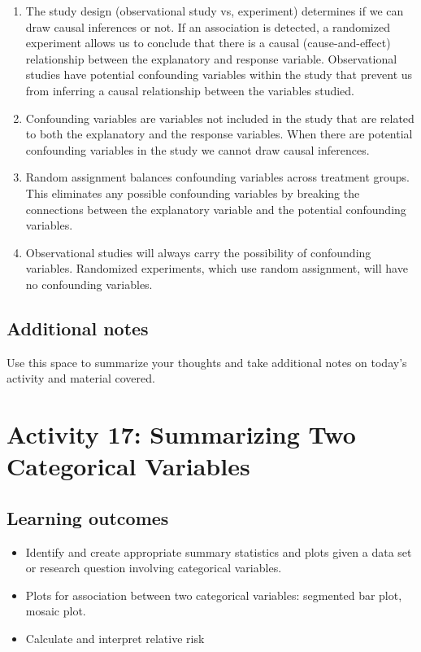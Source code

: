 \documentclass[
]{report}
\begin{document}
\begin{enumerate}
\def\labelenumi{\arabic{enumi}.}
\item
  The study design (observational study vs, experiment) determines if we can draw causal inferences or not. If an association is detected, a randomized experiment allows us to conclude that there is a causal (cause-and-effect) relationship between the explanatory and response variable. Observational studies have potential confounding variables within the study that prevent us from inferring a causal relationship between the variables studied.
\item
  Confounding variables are variables not included in the study that are related to both the explanatory and the response variables. When there are potential confounding variables in the study we cannot draw causal inferences.
\item
  Random assignment balances confounding variables across treatment groups. This eliminates any possible confounding variables by breaking the connections between the explanatory variable and the potential confounding variables.
\item
  Observational studies will always carry the possibility of confounding variables. Randomized experiments, which use random assignment, will have no confounding variables.
\end{enumerate}

\subsection{Additional notes}\label{additional-notes-15}

Use this space to summarize your thoughts and take additional notes on today's activity and material covered.

\newpage

\section{Activity 17: Summarizing Two Categorical Variables}\label{activity-17-summarizing-two-categorical-variables}


\subsection{Learning outcomes}\label{learning-outcomes-18}

\begin{itemize}
\item
  Identify and create appropriate summary statistics and plots given a data set or research question involving categorical variables.
\item
  Plots for association between two categorical variables:
  segmented bar plot, mosaic plot.
\item
  Calculate and interpret relative risk
\end{itemize}
\end{document}
